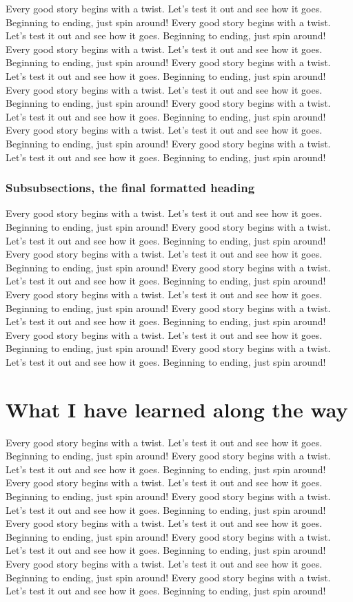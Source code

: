 Every good story begins with a twist. Let's test it out and see how it goes. Beginning to ending, just spin around! Every good story begins with a twist. Let's test it out and see how it goes. Beginning to ending, just spin around! Every good story begins with a twist. Let's test it out and see how it goes. Beginning to ending, just spin around! Every good story begins with a twist. Let's test it out and see how it goes. Beginning to ending, just spin around! Every good story begins with a twist. Let's test it out and see how it goes. Beginning to ending, just spin around! Every good story begins with a twist. Let's test it out and see how it goes. Beginning to ending, just spin around! Every good story begins with a twist. Let's test it out and see how it goes. Beginning to ending, just spin around! Every good story begins with a twist. Let's test it out and see how it goes. Beginning to ending, just spin around!

\subsubsection{Subsubsections, the final formatted heading}

Every good story begins with a twist. Let's test it out and see how it goes. Beginning to ending, just spin around! Every good story begins with a twist. Let's test it out and see how it goes. Beginning to ending, just spin around! Every good story begins with a twist. Let's test it out and see how it goes. Beginning to ending, just spin around! Every good story begins with a twist. Let's test it out and see how it goes. Beginning to ending, just spin around! Every good story begins with a twist. Let's test it out and see how it goes. Beginning to ending, just spin around! Every good story begins with a twist. Let's test it out and see how it goes. Beginning to ending, just spin around! Every good story begins with a twist. Let's test it out and see how it goes. Beginning to ending, just spin around! Every good story begins with a twist. Let's test it out and see how it goes. Beginning to ending, just spin around!

\section{What I have learned along the way}

Every good story begins with a twist. Let's test it out and see how it goes. Beginning to ending, just spin around! Every good story begins with a twist. Let's test it out and see how it goes. Beginning to ending, just spin around! Every good story begins with a twist. Let's test it out and see how it goes. Beginning to ending, just spin around! Every good story begins with a twist. Let's test it out and see how it goes. Beginning to ending, just spin around! Every good story begins with a twist. Let's test it out and see how it goes. Beginning to ending, just spin around! Every good story begins with a twist. Let's test it out and see how it goes. Beginning to ending, just spin around! Every good story begins with a twist. Let's test it out and see how it goes. Beginning to ending, just spin around! Every good story begins with a twist. Let's test it out and see how it goes. Beginning to ending, just spin around!